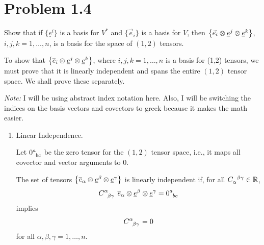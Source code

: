 \documentclass[12pt,a4paper]{article}
\newcommand{\und}[1]{\underline{#1}}
\newcommand{\ovr}[1]{\overline{#1}}
\begin{document}
	\section*{
		Problem 1.4
	}
	\begin{problem}
		Show that if $\{\und{e}^i\}$ is a basis for $V^*$ and 
		$\{\vec{e}_i\}$ is a basis for $V$, then $\qty{\vec{e}_i\otimes \und{e}^j \otimes \und{e}^k}$, $i,j,k = 1,\ldots,n$, is 
		a basis for the space of $(1,2)$ tensors.
	\end{problem}
	\begin{solution_pset}
		
		To show that $\qty{\ovr e_i \otimes \und e^j \otimes \und e^k}$, where $i,j,k=1,\ldots, n$
		is a basis for (1,2) tensors, we must prove that
		it is linearly independent and spans the entire $(1,2)$ tensor space.
		We shall prove these separately.

		\textit{Note:} I will be using abstract index notation here. Also, I will be switching the indices on the basis vectors and covectors to greek because it makes the math easier.

		\begin{enumerate}[(1)]
		    \item Linear Independence.


				Let $0\indices{^{a}_{bc}}$ be the zero tensor for the
				$(1,2)$ tensor space, i.e., it maps all covector and vector
				arguments to $0$.

				The set of tensors $
					\qty{
						\ovr e_\alpha \otimes \und e^\beta \otimes \und e^\gamma
					}
				$ is linearly independent
				if, for all $C\indices{_\alpha^{\beta\gamma}}\in\R$,
				\[
					C\indices{^\alpha_{\beta\gamma}}\ 
					\ovr e_\alpha \otimes \und e^\beta \otimes \und e^\gamma
					=
					0\indices{^{a}_{bc}}
				\]
				implies
				\[
					C\indices{^\alpha_{\beta\gamma}}=0
				\]
				for all $\alpha,\beta,\gamma=1,\ldots,n$.


\end{enumerate}
\end{solution_pset}
\end{document}
